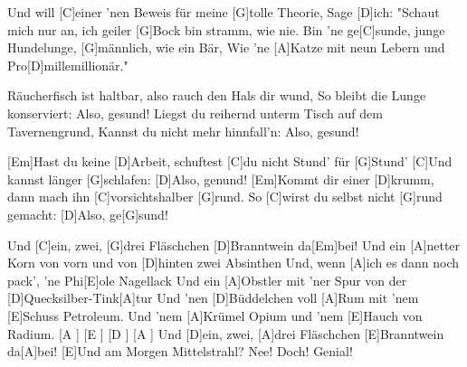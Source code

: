 \begin{guitar}
	Und will [C]einer 'nen Beweis für meine [G]tolle Theorie,
	Sage [D]ich: "Schaut mich nur an, ich geiler [G]Bock bin stramm, wie nie.
	Bin 'ne ge[C]sunde, junge Hundelunge, [G]männlich, wie ein Bär,
	Wie 'ne [A]Katze mit neun Lebern und Pro[D]millemillionär."
	
	Räucherfisch ist haltbar, also rauch den Hals dir wund,
	So bleibt die Lunge konserviert: Also, gesund!
	Liegst du reihernd unterm Tisch auf dem Tavernengrund,
	Kannst du nicht mehr hinnfall'n: Also, gesund!
	
	[Em]Hast du keine [D]Arbeit, schuftest [C]du nicht Stund' für [G]Stund'
	[C]Und kannst länger [G]schlafen: [D]Also, genund!
	[Em]Kommt dir einer [D]krumm, dann mach ihn [C]vorsichtshalber [G]rund.
	So [C]wirst du selbst nicht [G]rund gemacht: [D]Also, ge[G]sund!
	
	Und [C]ein, zwei, [G]drei Fläschchen [D]Branntwein da[Em]bei!
	Und ein [A]netter Korn von vorn und von [D]hinten zwei Absinthen
	Und, wenn [A]ich es dann noch pack', 'ne Phi[E]ole Nagellack
	Und ein [A]Obstler mit 'ner Spur von der [D]Quecksilber-Tink[A]tur
	Und 'nen [D]Büddelchen voll [A]Rum mit 'nem [E]Schuss Petroleum.
	Und 'nem [A]Krümel Opium und 'nem [E]Hauch von Radium.
	[A ] [E ] [D ] [A ] Und [D]ein, zwei, [A]drei Fläschchen [E]Branntwein da[A]bei!
	[E]Und am Morgen Mittelstrahl? Nee! Doch! Genial!

\end{guitar}